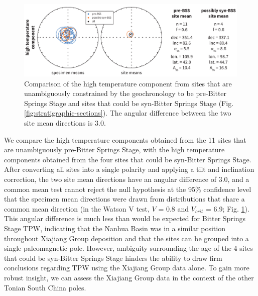\begin{figure}[h!]
    \centering
    \includegraphics[width=\textwidth]{figures/Xiajiang/lower-upper-comparison.pdf}
    \caption[Comparison of the high temperature component from sites that are pre-Bitter Springs Stage and sites that could be syn-Bitter Springs Stage.]{Comparison of the high temperature component from sites that are unambiguously constrained by the geochronology to be pre-Bitter Springs Stage and sites that could be syn-Bitter Springs Stage (Fig. \ref{fig:stratigraphic-sections}). The angular difference between the two site mean directions is 3.0\degrees.}
    \label{fig:lower-upper-comparison}
\end{figure}

We compare the high temperature components obtained from the 11 sites that are unambiguously pre-Bitter Springs Stage, with the high temperature components obtained from the four sites that could be syn-Bitter Springs Stage. After converting all sites into a single polarity and applying a tilt and inclination correction, the two site mean directions have an angular difference of 3.0\degrees, and a common mean test cannot reject the null hypothesis at the 95\% confidence level that the specimen mean directions were drawn from distributions that share a common mean direction (in the Watson V test, $V$ = 0.8 and $V_{crit}$ = 6.9; Fig. \ref{fig:lower-upper-comparison}). This angular difference is much less than would be expected for Bitter Springs Stage TPW, indicating that the Nanhua Basin was in a similar position throughout Xiajiang Group deposition and that the sites can be grouped into a single paleomagnetic pole. However, ambiguity surrounding the age of the 4 sites that could be syn-Bitter Springs Stage hinders the ability to draw firm conclusions regarding TPW using the Xiajiang Group data alone. To gain more robust insight, we can assess the Xiajiang Group data in the context of the other Tonian South China poles.

